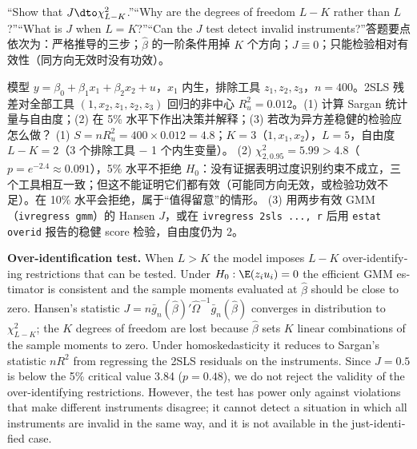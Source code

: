\begin{keypt}[英文试卷可能的问法]
“Show that $J\dto\chi^2_{L-K}$.”“Why are the degrees of freedom $L-K$ rather than $L$?”“What is $J$ when $L=K$?”“Can the $J$ test detect invalid instruments?”答题要点依次为：严格推导的三步；$\hat\beta$ 的一阶条件用掉 $K$ 个方向；$J\equiv0$；只能检验相对有效性（同方向无效时没有功效）。
\end{keypt}

\begin{prac}\label{pr:U09-sargan}
模型 $y=\beta_0+\beta_1x_1+\beta_2x_2+u$，$x_1$ 内生，排除工具 $z_1,z_2,z_3$，$n=400$。2SLS 残差对全部工具 $(1,x_2,z_1,z_2,z_3)$ 回归的非中心 $R_u^2=0.012$。(1) 计算 Sargan 统计量与自由度；(2) 在 5\% 水平下作出决策并解释；(3) 若改为异方差稳健的检验应怎么做？
\answer
(1) $S=nR_u^2=400\times0.012=4.8$；$K=3$（$1,x_1,x_2$），$L=5$，自由度 $L-K=2$（3 个排除工具 $-$ 1 个内生变量）。
(2) $\chi^2_{2,0.95}=5.99>4.8$（$p=e^{-2.4}\approx0.091$），5\% 水平不拒绝 $H_0$：没有证据表明过度识别约束不成立，三个工具相互一致；但这不能证明它们都有效（可能同方向无效，或检验功效不足）。在 10\% 水平会拒绝，属于“值得留意”的情形。
(3) 用两步有效 GMM（\texttt{ivregress gmm}）的 Hansen $J$，或在 \texttt{ivregress 2sls ..., r} 后用 \texttt{estat overid} 报告的稳健 score 检验，自由度仍为 2。
\end{prac}

\begin{english}
\textbf{Over-identification test.} When $L>K$ the model imposes $L-K$ over-identifying restrictions that can be tested. Under $H_0:\E(z_iu_i)=0$ the efficient GMM estimator is consistent and the sample moments evaluated at $\hat\beta$ should be close to zero. Hansen's statistic $J=n\bar g_n(\hat\beta)'\hat\Omega^{-1}\bar g_n(\hat\beta)$ converges in distribution to $\chi^2_{L-K}$; the $K$ degrees of freedom are lost because $\hat\beta$ sets $K$ linear combinations of the sample moments to zero. Under homoskedasticity it reduces to Sargan's statistic $nR^2$ from regressing the 2SLS residuals on the instruments. Since $J=0.5$ is below the 5\% critical value 3.84 ($p=0.48$), we do not reject the validity of the over-identifying restrictions. However, the test has power only against violations that make different instruments disagree; it cannot detect a situation in which all instruments are invalid in the same way, and it is not available in the just-identified case.
\end{english}


